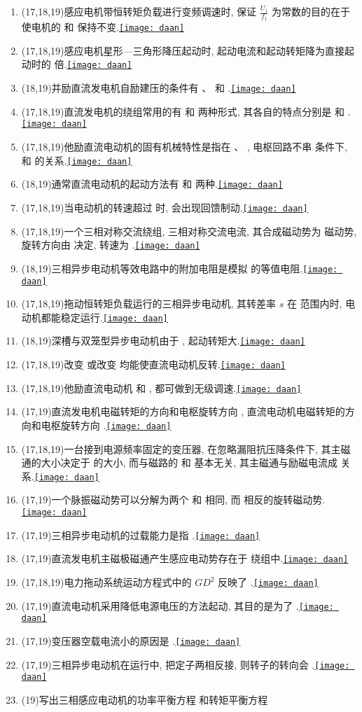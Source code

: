 \documentclass[lang=cn,11pt,marginpar=margintrue]{elegantbook}%
\newcommand{\daan}[1]{\hfill\hyperref[#1]{\texttt{[image: daan]}}}
\newcommand{\xiahua}[1]{ \underline{\hspace{#1 pc}} }
\begin{document}
\begin{enumerate}
	\xiahua{4}磁场, 而变压器为\xiahua{4}磁场.\daan{tk:7}
	\item (17,18,19)感应电机带恒转矩负载进行变频调速时, 保证 $\frac{U_1}{f_1}$ 为常数的目的在于使电机的\xiahua{4}和\xiahua{4}保持不变.\daan{tk:8}
	\item (17,18,19)感应电机星形—三角形降压起动时, 起动电流和起动转矩降为直接起动时的\xiahua{4}倍.\daan{tk:9}
	\item (18,19)并励直流发电机自励建压的条件有\xiahua{4}、\xiahua{8}和\xiahua{4}.\daan{tk:10}
	\item (17,18,19)直流发电机的绕组常用的有\xiahua{4}和\xiahua{4}两种形式, 其各自的特点分别是\xiahua{8}和\xiahua{8}.\daan{tk:11}
	\item (17,18,19)他励直流电动机的固有机械特性是指在\xiahua{4}、\xiahua{4}, 电枢回路不串\xiahua{4}条件下,\xiahua{4}和\xiahua{4}的关系.\daan{tk:12}
	\item (18,19)通常直流电动机的起动方法有\xiahua{4}和\xiahua{4}两种.\daan{tk:13}
	\item (17,18,19)当电动机的转速超过\xiahua{4}时, 会出现回馈制动.\daan{tk:14}
	\item (17,18,19)一个三相对称交流绕组, 三相对称交流电流, 其合成磁动势为\xiahua{4}磁动势, 旋转方向由\xiahua{4}决定, 转速为\xiahua{4}.\daan{tk:15}
	\item (18,19)三相异步电动机等效电路中的附加电阻是模拟\xiahua{4}的等值电阻.\daan{tk:16}
	\item (17,18,19)拖动恒转矩负载运行的三相异步电动机, 其转差率 $s$ 在\xiahua{4}范围内时, 电动机都能稳定运行.\daan{tk:17}
	\item (18,19)深槽与双笼型异步电动机由于\xiahua{4}, 起动转矩大.\daan{tk:18}
	\item (17,18,19)改变\xiahua{4}或改变\xiahua{4}均能使直流电动机反转.\daan{tk:19}
	\item (17,18,19)他励直流电动机\xiahua{4}和\xiahua{4}, 都可做到无级调速.\daan{tk:20}
	\item (17,19)直流发电机电磁转矩的方向和电枢旋转方向\xiahua{4}, 直流电动机电磁转矩的方向和电枢旋转方向\xiahua{4}.\daan{tk:21}
	\item (17,18,19)一台接到电源频率固定的变压器, 在忽略漏阻抗压降条件下, 其主磁通的大小决定于\xiahua{4}的大小, 而与磁路的\xiahua{4}和\xiahua{4}基本无关, 其主磁通与励磁电流成\xiahua{4}关系.\daan{tk:22}
	\item (17,19)一个脉振磁动势可以分解为两个\xiahua{4}和\xiahua{4}相同, 而\xiahua{4}相反的旋转磁动势.\daan{tk:23}
	\item (17,19)三相异步电动机的过载能力是指\xiahua{4}.\daan{tk:24}
	\item (17,19)直流发电机主磁极磁通产生感应电动势存在于\xiahua{4}绕组中.\daan{tk:25}
	\item (17,18,19)电力拖动系统运动方程式中的 $GD^2$ 反映了\xiahua{8}.\daan{tk:26}
	\item (17,19)直流电动机采用降低电源电压的方法起动, 其目的是为了\xiahua{4}.\daan{tk:27}
	\item (17,19)变压器空载电流小的原因是\xiahua{8}.\daan{tk:28}
	\item (17,19)三相异步电动机在运行中, 把定子两相反接, 则转子的转向会\xiahua{4}.\daan{tk:29}
	\item (19)写出三相感应电动机的功率平衡方程\xiahua{8}和转矩平衡方程
	

\end{enumerate}
\end{document}
